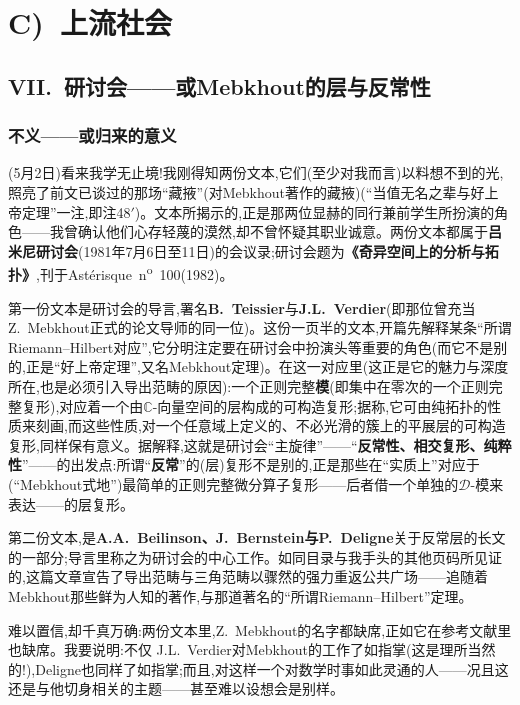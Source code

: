 \chapter{C)~上流社会}

\section{VII.~研讨会——或Mebkhout的层与反常性}

\subsection{不义——或归来的意义}


\dmark{}(5月2日)看来我学无止境!我刚得知两份文本,它们(至少对我而言)以料想不到的光,照亮了前文已谈过的那场“藏掖”(对Mebkhout著作的藏掖)(“当值无名之辈与好上帝定理”一注,即注48$'$)。文本所揭示的,正是那两位显赫的同行兼前学生所扮演的角色——我曾确认他们心存轻蔑的漠然,却不曾怀疑其职业诚意。两份文本都属于\textbf{吕米尼研讨会}(1981年7月6日至11日)的会议录;研讨会题为\textbf{《奇异空间上的分析与拓扑》},刊于Astérisque~n\textsuperscript{o}~100(1982)。

第一份文本是研讨会的导言,署名\textbf{B.~Teissier}与\textbf{J.L.~Verdier}(即那位曾充当 Z.~Mebkhout正式的论文导师的同一位)。这份一页半的文本,开篇先解释某条“所谓Riemann--Hilbert对应”,它分明注定要在研讨会中扮演头等重要的角色(而它不是别的,正是“好上帝定理”,又名Mebkhout定理)。在这一对应里(这正是它的魅力与深度所在,也是必须引入导出范畴的原因):一个正则完整\textbf{模}(即集中在零次的一个正则完整复形),对应着一个由$\mathbb{C}$-向量空间的层构成的可构造复形;据称,它可由纯拓扑的性质来刻画,而这些性质,对一个任意域上定义的、不必光滑的簇上的平展层的可构造复形,同样保有意义。据解释,这就是研讨会“主旋律”——“\textbf{反常性、相交复形、纯粹性}”——的出发点:所谓“\textbf{反常}”的(\dmark{}层)复形不是别的,正是那些在“实质上”对应于(“Mebkhout式地”)最简单的正则完整微分算子复形——后者借一个单独的$\mathcal{D}$-模来表达——的层复形。

第二份文本,是\textbf{A.A.~Beilinson、J.~Bernstein与P.~Deligne}关于反常层的长文的一部分;导言里称之为研讨会的中心工作。如同目录与我手头的其他页码所见证的,这篇文章宣告了导出范畴与三角范畴以骤然的强力重返公共广场——追随着Mebkhout那些鲜为人知的著作,与那道著名的“所谓Riemann--Hilbert”定理。

难以置信,却千真万确:两份文本里,Z.~Mebkhout的名字都缺席,正如它在参考文献里也缺席。我要说明:不仅 J.L.~Verdier对Mebkhout的工作了如指掌(这是理所当然的!),Deligne也同样了如指掌;而且,对这样一个对数学时事如此灵通的人——况且这还是与他切身相关的主题——甚至难以设想会是别样。

